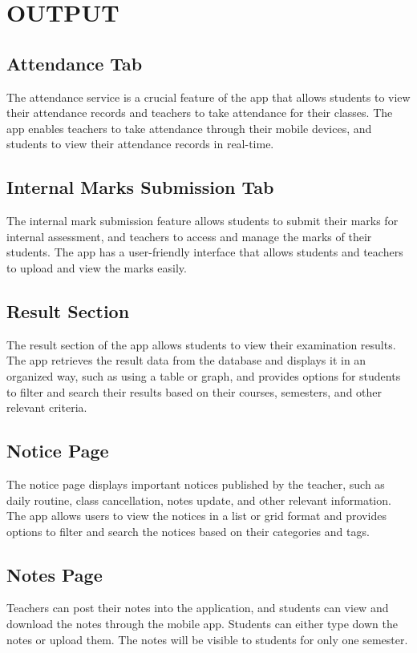 \chapter{OUTPUT}

\section{Attendance Tab}
The attendance service is a crucial feature of the app that allows students to view their attendance records and teachers to take attendance for their classes. The app enables teachers to take attendance through their mobile devices, and students to view their attendance records in real-time.

\section{Internal Marks Submission Tab}
The internal mark submission feature allows students to submit their marks for internal assessment, and teachers to access and manage the marks of their students. The app has a user-friendly interface that allows students and teachers to upload and view the marks easily.

\section{Result Section}
The result section of the app allows students to view their examination results. The app retrieves the result data from the database and displays it in an organized way, such as using a table or graph, and provides options for students to filter and search their results based on their courses, semesters, and other relevant criteria.

\section{Notice Page}
The notice page displays important notices published by the teacher, such as daily routine, class cancellation, notes update, and other relevant information. The app allows users to view the notices in a list or grid format and provides options to filter and search the notices based on their categories and tags.

\section{Notes Page}
Teachers can post their notes into the application, and students can view and download the notes through the mobile app. Students can either type down the notes or upload them. The notes will be visible to students for only one semester.

